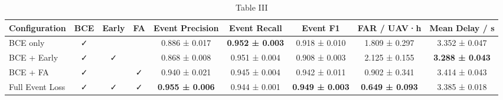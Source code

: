 \begin{table}[htbp]
  \centering
  \caption{Table III}
  \label{tab:table03_event_loss_ablation}
  \begin{tabular}{lcccccccc}
    \toprule
    Configuration & BCE & Early & FA & Event Precision & Event Recall & Event F1 & FAR / UAV·h & Mean Delay / s \\
    \midrule
    BCE only & ✓ &  &  & 0.886 ± 0.017 & \textbf{0.952 ± 0.003} & 0.918 ± 0.010 & 1.809 ± 0.297 & 3.352 ± 0.047 \\
    BCE + Early & ✓ & ✓ &  & 0.868 ± 0.008 & 0.951 ± 0.004 & 0.908 ± 0.003 & 2.125 ± 0.155 & \textbf{3.288 ± 0.043} \\
    BCE + FA & ✓ &  & ✓ & 0.940 ± 0.021 & 0.945 ± 0.004 & 0.942 ± 0.011 & 0.902 ± 0.341 & 3.414 ± 0.043 \\
    Full Event Loss & ✓ & ✓ & ✓ & \textbf{0.955 ± 0.006} & 0.944 ± 0.001 & \textbf{0.949 ± 0.003} & \textbf{0.649 ± 0.093} & 3.385 ± 0.018 \\
    \bottomrule
  \end{tabular}
\end{table}
